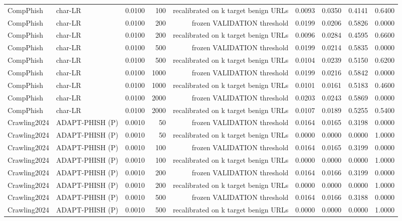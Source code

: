 \begin{table}[t]
\begin{tabular}{llrrrrrrr}
CompPhish & char-LR & 0.0100 & 100 & recalibrated on k target benign URLs & 0.0093 & 0.0350 & 0.4141 & 0.6400 \\
CompPhish & char-LR & 0.0100 & 200 & frozen VALIDATION threshold & 0.0199 & 0.0206 & 0.5826 & 0.0000 \\
CompPhish & char-LR & 0.0100 & 200 & recalibrated on k target benign URLs & 0.0096 & 0.0284 & 0.4595 & 0.6600 \\
CompPhish & char-LR & 0.0100 & 500 & frozen VALIDATION threshold & 0.0199 & 0.0214 & 0.5835 & 0.0000 \\
CompPhish & char-LR & 0.0100 & 500 & recalibrated on k target benign URLs & 0.0104 & 0.0239 & 0.5150 & 0.6200 \\
CompPhish & char-LR & 0.0100 & 1000 & frozen VALIDATION threshold & 0.0199 & 0.0216 & 0.5842 & 0.0000 \\
CompPhish & char-LR & 0.0100 & 1000 & recalibrated on k target benign URLs & 0.0101 & 0.0161 & 0.5183 & 0.4600 \\
CompPhish & char-LR & 0.0100 & 2000 & frozen VALIDATION threshold & 0.0203 & 0.0243 & 0.5869 & 0.0000 \\
CompPhish & char-LR & 0.0100 & 2000 & recalibrated on k target benign URLs & 0.0107 & 0.0189 & 0.5255 & 0.5400 \\
Crawling2024 & ADAPT-PHISH (P) & 0.0010 & 50 & frozen VALIDATION threshold & 0.0164 & 0.0165 & 0.3198 & 0.0000 \\
Crawling2024 & ADAPT-PHISH (P) & 0.0010 & 50 & recalibrated on k target benign URLs & 0.0000 & 0.0000 & 0.0000 & 1.0000 \\
Crawling2024 & ADAPT-PHISH (P) & 0.0010 & 100 & frozen VALIDATION threshold & 0.0164 & 0.0165 & 0.3199 & 0.0000 \\
Crawling2024 & ADAPT-PHISH (P) & 0.0010 & 100 & recalibrated on k target benign URLs & 0.0000 & 0.0000 & 0.0000 & 1.0000 \\
Crawling2024 & ADAPT-PHISH (P) & 0.0010 & 200 & frozen VALIDATION threshold & 0.0164 & 0.0166 & 0.3199 & 0.0000 \\
Crawling2024 & ADAPT-PHISH (P) & 0.0010 & 200 & recalibrated on k target benign URLs & 0.0000 & 0.0000 & 0.0000 & 1.0000 \\
Crawling2024 & ADAPT-PHISH (P) & 0.0010 & 500 & frozen VALIDATION threshold & 0.0164 & 0.0166 & 0.3188 & 0.0000 \\
Crawling2024 & ADAPT-PHISH (P) & 0.0010 & 500 & recalibrated on k target benign URLs & 0.0000 & 0.0000 & 0.0000 & 1.0000 \\

\end{tabular}
\end{table}
